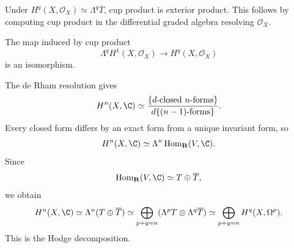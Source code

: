 \begin{remark}
\label{mumford-frag-cup-product}
Under $H^q(X,\mathcal O_X)\simeq\Lambda^q\overline T$, cup product is
exterior product.  This follows by computing cup product in the differential
graded algebra resolving $\mathcal O_X$.
\end{remark}

\begin{corollary}
\label{mumford-frag-cup-cor}
The map induced by cup product
\[
 \Lambda^qH^1(X,\mathcal O_X)\longrightarrow H^q(X,\mathcal O_X)
\]
is an isomorphism.
\end{corollary}

\begin{remark}
\label{mumford-frag-hodge}
The de Rham resolution gives
\[
 H^n(X,\C)\simeq
 \frac{\{d\text{-closed $n$-forms}\}}{d\{\text{$(n-1)$-forms}\}}.
\]
Every closed form differs by an exact form from a unique invariant form, so
\[
 H^n(X,\C)\simeq\Lambda^n\operatorname{Hom}_{\mathbf R}(V,\C).
\]
Since
\[
 \operatorname{Hom}_{\mathbf R}(V,\C)\simeq T\oplus\overline T,
\]
we obtain
\[
 H^n(X,\C)\simeq\Lambda^n(T\oplus\overline T)
 \simeq\bigoplus_{p+q=n}(\Lambda^pT\otimes\Lambda^q\overline T)
 \simeq\bigoplus_{p+q=n}H^q(X,\Omega^p).
\]
This is the Hodge decomposition.
\end{remark}

